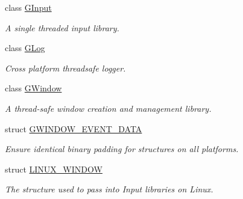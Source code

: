 \begin{DoxyCompactItemize}
class \mbox{\hyperlink{class_g_w_1_1_s_y_s_t_e_m_1_1_g_input}{G\+Input}}
\begin{DoxyCompactList}\small\item\em A single threaded input library. \end{DoxyCompactList}\item 
class \mbox{\hyperlink{class_g_w_1_1_s_y_s_t_e_m_1_1_g_log}{G\+Log}}
\begin{DoxyCompactList}\small\item\em Cross platform threadsafe logger. \end{DoxyCompactList}\item 
class \mbox{\hyperlink{class_g_w_1_1_s_y_s_t_e_m_1_1_g_window}{G\+Window}}
\begin{DoxyCompactList}\small\item\em A thread-\/safe window creation and management library. \end{DoxyCompactList}\item 
struct \mbox{\hyperlink{struct_g_w_1_1_s_y_s_t_e_m_1_1_g_w_i_n_d_o_w___e_v_e_n_t___d_a_t_a}{G\+W\+I\+N\+D\+O\+W\+\_\+\+E\+V\+E\+N\+T\+\_\+\+D\+A\+TA}}
\begin{DoxyCompactList}\small\item\em Ensure identical binary padding for structures on all platforms. \end{DoxyCompactList}\item 
struct \mbox{\hyperlink{struct_g_w_1_1_s_y_s_t_e_m_1_1_l_i_n_u_x___w_i_n_d_o_w}{L\+I\+N\+U\+X\+\_\+\+W\+I\+N\+D\+OW}}
\begin{DoxyCompactList}\small\item\em The structure used to pass into Input libraries on Linux. \end{DoxyCompactList}\end{DoxyCompactItemize}
